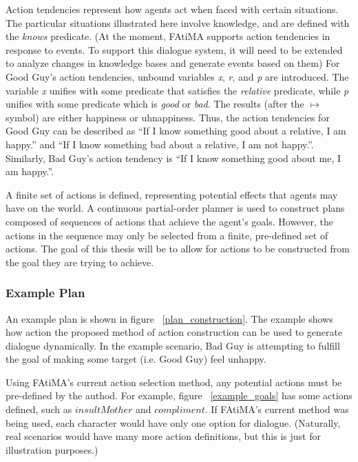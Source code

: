 \documentclass{article}
\begin{document}
Action tendencies represent how agents act when faced with certain
situations.  The particular situations illustrated here involve
knowledge, and are defined with the \emph{knows} predicate.  (At the
moment, FAtiMA supports action tendencies in response to events.  To
support this dialogue system, it will need to be extended to analyze
changes in knowledge bases and generate events based on them)
For Good Guy's action tendencies,
unbound variables \emph{x}, \emph{r}, and \emph{p} are introduced.
The variable \emph{x} unifies with some predicate that satisfies the
\emph{relative} predicate, while \emph{p}
unifies with some predicate which is \emph{good} or \emph{bad}.
The results (after the $\mapsto$ symbol) are either happiness or uhnappiness.  Thus, the
action tendencies for Good Guy can be described as ``If I know something
good about a relative, I am happy.'' and ``If I know something bad about a relative, I
am not happy.''.  Similarly, Bad Guy's action tendency is ``If I know
something good about me, I am happy.''.

A finite set of actions is defined, representing potential effects
that agents may have on the world.  A continuous partial-order planner
\cite{Paiva2005, Russell2003} is used to construct plans composed of
sequences of actions that achieve the agent's goals.  However, the
actions in the sequence may only be selected from a finite,
pre-defined set of actions.  The goal of this thesis will be to allow
for actions to be constructed from the goal they are trying to achieve.

\subsubsection{Example Plan}

An example plan is shown in figure ~\ref{plan_construction}.
The example shows how action the proposed method of action
construction can be used to generate dialogue dynamically.
In the example scenario, Bad Guy is attempting to fulfill the goal of making some
target (i.e. Good Guy) feel unhappy.

Using FAtiMA's current action selection method, any potential
actions must be pre-defined by the authod.  For example, figure
~\ref{example_goals} has some actions defined, such as $insultMother$ and
$compliment$.  If FAtiMA's current method was being used, each
character would have only one option for dialogue.  (Naturally,
real scenarios would have many more action definitions, but this is
just for illustration purposes.)
\end{document}
